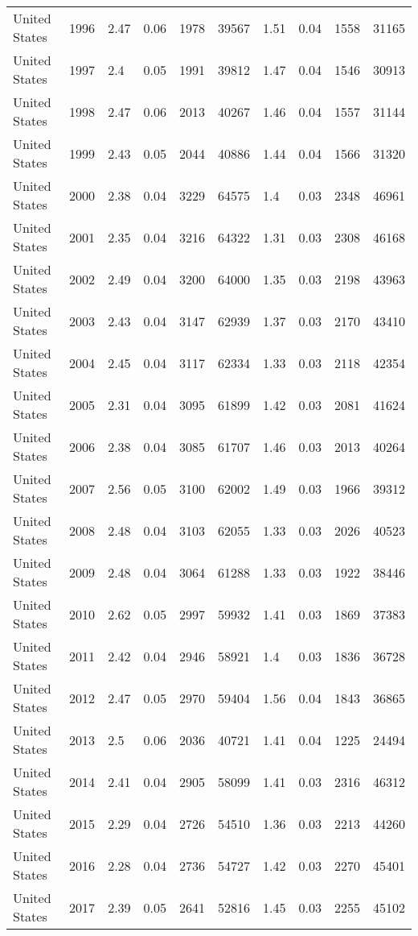 \begin{tabular}{llllllllll}
United States & 1996 & 2.47 & 0.06 & 1978 & 39567 & 1.51 & 0.04 & 1558 & 31165 \\ 
United States & 1997 & 2.4 & 0.05 & 1991 & 39812 & 1.47 & 0.04 & 1546 & 30913 \\ 
United States & 1998 & 2.47 & 0.06 & 2013 & 40267 & 1.46 & 0.04 & 1557 & 31144 \\ 
United States & 1999 & 2.43 & 0.05 & 2044 & 40886 & 1.44 & 0.04 & 1566 & 31320 \\ 
United States & 2000 & 2.38 & 0.04 & 3229 & 64575 & 1.4 & 0.03 & 2348 & 46961 \\ 
United States & 2001 & 2.35 & 0.04 & 3216 & 64322 & 1.31 & 0.03 & 2308 & 46168 \\ 
United States & 2002 & 2.49 & 0.04 & 3200 & 64000 & 1.35 & 0.03 & 2198 & 43963 \\ 
United States & 2003 & 2.43 & 0.04 & 3147 & 62939 & 1.37 & 0.03 & 2170 & 43410 \\ 
United States & 2004 & 2.45 & 0.04 & 3117 & 62334 & 1.33 & 0.03 & 2118 & 42354 \\ 
United States & 2005 & 2.31 & 0.04 & 3095 & 61899 & 1.42 & 0.03 & 2081 & 41624 \\ 
United States & 2006 & 2.38 & 0.04 & 3085 & 61707 & 1.46 & 0.03 & 2013 & 40264 \\ 
United States & 2007 & 2.56 & 0.05 & 3100 & 62002 & 1.49 & 0.03 & 1966 & 39312 \\ 
United States & 2008 & 2.48 & 0.04 & 3103 & 62055 & 1.33 & 0.03 & 2026 & 40523 \\ 
United States & 2009 & 2.48 & 0.04 & 3064 & 61288 & 1.33 & 0.03 & 1922 & 38446 \\ 
United States & 2010 & 2.62 & 0.05 & 2997 & 59932 & 1.41 & 0.03 & 1869 & 37383 \\ 
United States & 2011 & 2.42 & 0.04 & 2946 & 58921 & 1.4 & 0.03 & 1836 & 36728 \\ 
United States & 2012 & 2.47 & 0.05 & 2970 & 59404 & 1.56 & 0.04 & 1843 & 36865 \\ 
United States & 2013 & 2.5 & 0.06 & 2036 & 40721 & 1.41 & 0.04 & 1225 & 24494 \\ 
United States & 2014 & 2.41 & 0.04 & 2905 & 58099 & 1.41 & 0.03 & 2316 & 46312 \\ 
United States & 2015 & 2.29 & 0.04 & 2726 & 54510 & 1.36 & 0.03 & 2213 & 44260 \\ 
United States & 2016 & 2.28 & 0.04 & 2736 & 54727 & 1.42 & 0.03 & 2270 & 45401 \\ 
United States & 2017 & 2.39 & 0.05 & 2641 & 52816 & 1.45 & 0.03 & 2255 & 45102 \\ 

\end{tabular}
